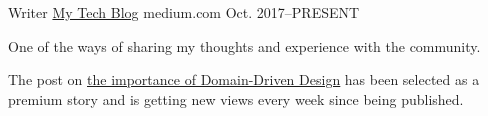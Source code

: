 

\begin{cventries}

  \cventry
    {Writer} %
    {\href{https://medium.com/@rlewan}{My Tech Blog}} %
    {medium.com} %
    {Oct. 2017–PRESENT} %
    {
      \begin{cvitems} %
        \item {One of the ways of sharing my thoughts and experience with the community.}
        \item {The post on \href{https://medium.com/swinginc/save-time-by-doing-time-the-right-way-with-domain-driven-apis-72321fe09a90}{\underline{the importance of Domain-Driven Design}} has been selected as a premium story and is getting new views every week since being published.}
      \end{cvitems}
    }

\end{cventries}
